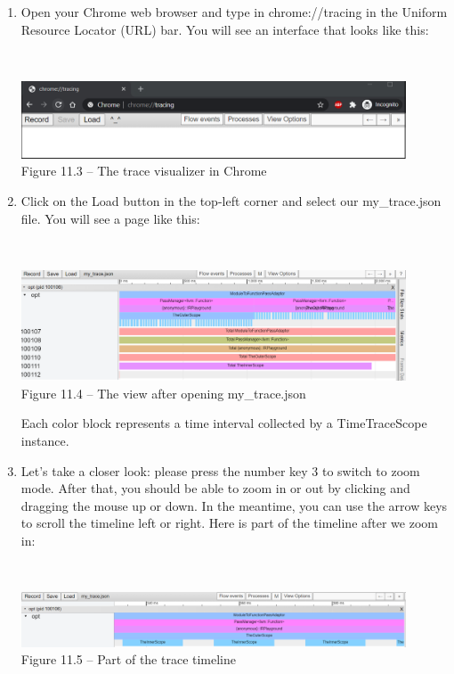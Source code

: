 \begin{enumerate}
\item Open your Chrome web browser and type in chrome://tracing in the Uniform Resource Locator (URL) bar. You will see an interface that looks like this:

\hspace*{\fill} \\ %
\begin{center}
\includegraphics[width=0.9\textwidth]{content/3/chapter11/images/3.png}\\
Figure 11.3 – The trace visualizer in Chrome
\end{center}

\item Click on the Load button in the top-left corner and select our my\_trace.json file. You will see a page like this:

\hspace*{\fill} \\ %
\begin{center}
\includegraphics[width=0.9\textwidth]{content/3/chapter11/images/4.png}\\
Figure 11.4 – The view after opening my\_trace.json
\end{center}

Each color block represents a time interval collected by a TimeTraceScope instance.

\item Let's take a closer look: please press the number key 3 to switch to zoom mode. After that, you should be able to zoom in or out by clicking and dragging the mouse up or down. In the meantime, you can use the arrow keys to scroll the timeline left or right. Here is part of the timeline after we zoom in:

\hspace*{\fill} \\ %
\begin{center}
\includegraphics[width=0.9\textwidth]{content/3/chapter11/images/5.png}\\
Figure 11.5 – Part of the trace timeline
\end{center}


\end{enumerate}
